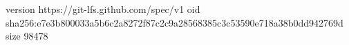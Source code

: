 version https://git-lfs.github.com/spec/v1
oid sha256:e7e3b800033a5b6c2a8272f87c2c9a28568385c3c53590e718a38b0dd942769d
size 98478
